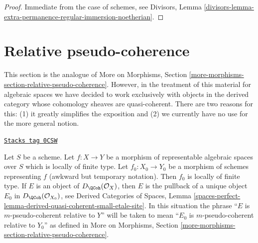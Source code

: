 \begin{proof}
Immediate from the case of schemes, see Divisors, Lemma
\ref{divisors-lemma-extra-permanence-regular-immersion-noetherian}.
\end{proof}

\section{Relative pseudo-coherence}
\label{spaces-more-morphisms-section-relative-pseudo-coherence}
This section is the analogue of
More on Morphisms, Section
\ref{more-morphisms-section-relative-pseudo-coherence}.
However, in the treatment of this material for
algebraic spaces we have decided to work exclusively
with objects in the derived category whose cohomology
sheaves are quasi-coherent. There are two reasons for this:
(1) it greatly simplifies the exposition and
(2) we currently have no use for the more general notion.

\begin{remark}
\label{spaces-more-morphisms-remark-match-relative-pseudo-coherence}
\href{https://stacks.math.columbia.edu/tag/0CSW}{\texttt{Stacks tag 0CSW}}

Let $S$ be a scheme. Let $f : X \to Y$ be a morphism of representable
algebraic spaces over $S$ which is locally of finite type. Let
$f_0 : X_0 \to Y_0$ be a morphism of schemes representing $f$
(awkward but temporary notation). Then $f_0$ is locally of finite type.
If $E$ is an object of $D_\QCoh(\mathcal{O}_X)$, then $E$
is the pullback of a unique object $E_0$ in $D_\QCoh(\mathcal{O}_{X_0})$, see
Derived Categories of Spaces, Lemma
\ref{spaces-perfect-lemma-derived-quasi-coherent-small-etale-site}.
In this situation the phrase ``$E$ is $m$-pseudo-coherent relative to $Y$''
will be taken to mean ``$E_0$ is $m$-pseudo-coherent relative to $Y_0$''
as defined in More on Morphisms, Section
\ref{more-morphisms-section-relative-pseudo-coherence}.
\end{remark}

